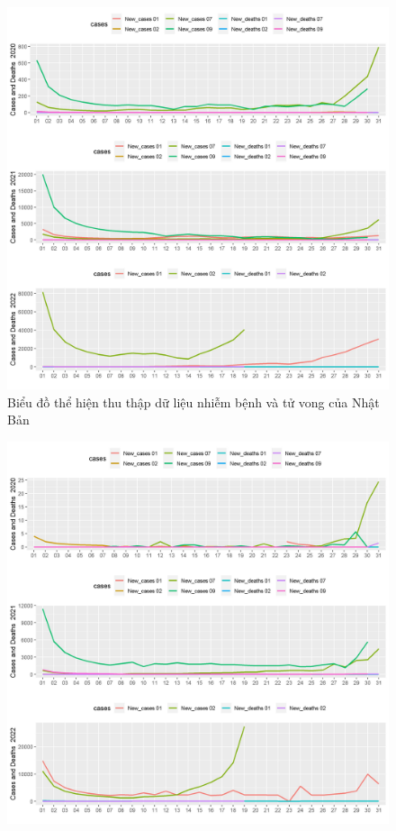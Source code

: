 \documentclass[a4paper]{article}
\theoremstyle{definition}
\begin{document}
\begin{enumerate}[i)]
\begin{enumerate}[1)]
\begin{figure}[htp]
		    \includegraphics[scale = 0.7]{Images/VI/vi3 Japan .jpeg}
		    \caption{Biểu đồ thể hiện thu thập dữ liệu nhiễm bệnh và tử vong của Nhật Bản}
		    \label{fig:my_label}
		\end{figure}
		\begin{figure}[htp]
		    \centering
		    \includegraphics[scale = 0.7]{Images/VI/vi3 Vietnam .jpeg} 

\end{figure}
\end{enumerate}
\end{enumerate}
\end{document}
